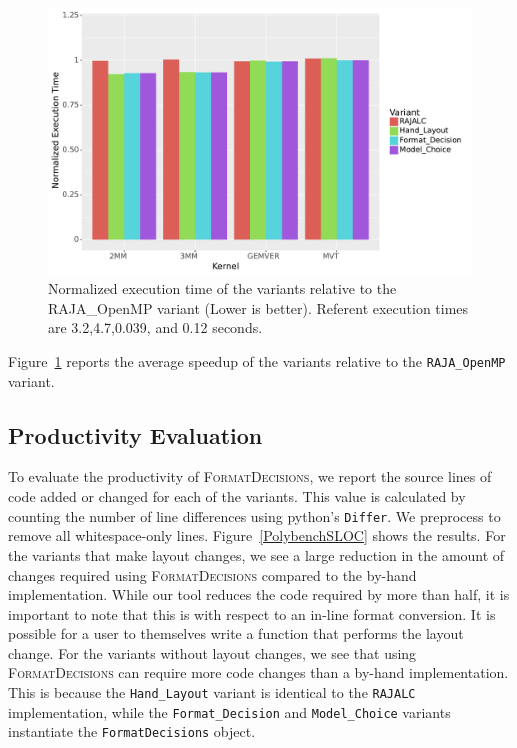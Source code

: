\documentclass[sigconf,review=true]{acmart}
\newcommand{\FormatDecisions}[0]{{\textsc{FormatDecisions}}}
\begin{document}
\begin{figure}
	\includegraphics[width=\columnwidth]{PolybenchPerfPlot.pdf}
	\caption{Normalized execution time of the variants relative to the RAJA\_OpenMP variant (Lower is better). Referent execution times are 3.2,4.7,0.039, and 0.12 seconds.}
	\label{PolybenchPerformance}
\end{figure}


Figure~\ref{PolybenchPerformance} reports the average speedup of the variants relative to the \verb.RAJA_OpenMP. variant. 



\subsection{Productivity Evaluation}

To evaluate the productivity of \textsc{FormatDecisions}, we report the source lines of code added or changed for each of the variants.
This value is calculated by counting the number of line differences using python's \verb.Differ.. 
We preprocess to remove all whitespace-only lines.
Figure~\ref{PolybenchSLOC} shows the results.
For the variants that make layout changes, we see a large reduction in the amount of changes required using \FormatDecisions{} compared to the by-hand implementation. 
While our tool reduces the code required by more than half, it is important to note that this is with respect to an in-line format conversion.
It is possible for a user to themselves write a function that performs the layout change.
For the variants without layout changes, we see that using \FormatDecisions{} can require more code changes than a by-hand implementation. 
This is because the \verb.Hand_Layout. variant is identical to the \verb.RAJALC. implementation, while the \verb.Format_Decision. and \verb.Model_Choice. variants instantiate the \verb.FormatDecisions. object.
\end{document}

